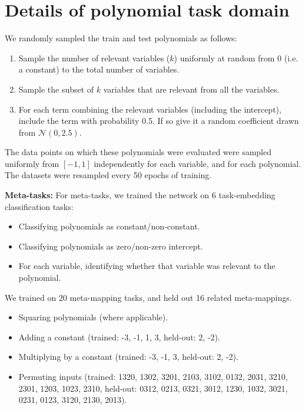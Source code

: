 \section{Details of polynomial task domain} \label{app:HoMM:polynomials_methods}
We randomly sampled the train and test polynomials as follows:
\begin{enumerate}
\item Sample the number of relevant variables ($k$) uniformly at random from 0 (i.e. a constant) to the total number of variables.
\item Sample the subset of $k$ variables that are relevant from all the variables.
\item For each term combining the relevant variables (including the intercept), include the term with probability 0.5. If so give it a random coefficient drawn from $\mathcal{N}(0, 2.5)$.
\end{enumerate}
The data points on which these polynomials were evaluated were sampled uniformly from $[-1, 1]$ independently for each variable, and for each polynomial. The datasets were resampled every 50 epochs of training. \par
\textbf{Meta-tasks:} For meta-tasks, we trained the network on 6 task-embedding classification tasks:
\begin{itemize}
\item Classifying polynomials as constant/non-constant.
\item Classifying polynomials as zero/non-zero intercept.
\item For each variable, identifying whether that variable was relevant to the polynomial.
\end{itemize}
We trained on 20 meta-mapping tasks, and held out 16 related meta-mappings.
\begin{itemize}
\item Squaring polynomials (where applicable).
\item Adding a constant (trained: -3, -1, 1, 3, held-out: 2, -2).
\item Multiplying by a constant (trained: -3, -1, 3, held-out: 2, -2).
\item Permuting inputs (trained: 1320, 1302, 3201, 2103, 3102, 0132, 2031, 3210, 2301, 1203, 1023, 2310, held-out: 0312, 0213, 0321, 3012, 1230, 1032, 3021, 0231, 0123, 3120, 2130, 2013).
\end{itemize}

